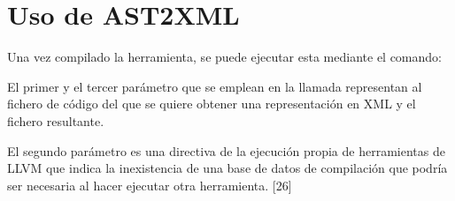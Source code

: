 \section{Uso de AST2XML}

Una vez compilado la herramienta, se puede ejecutar esta mediante el comando:




El primer y el tercer par\'ametro que se emplean en la llamada representan al fichero de c\'odigo del que se quiere obtener una representaci\'on en XML y el fichero resultante.

El segundo par\'ametro es una directiva de la ejecuci\'on propia de herramientas de LLVM que indica la inexistencia de una base de datos de compilaci\'on que podr\'ia ser necesaria al hacer ejecutar otra herramienta. [26]











